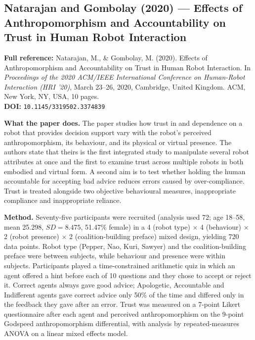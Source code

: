 \documentclass[11pt, a4paper]{article}
\begin{document}
\vspace{8pt}

\subsection{Natarajan and Gombolay (2020) --- Effects of Anthropomorphism and Accountability on Trust in Human Robot Interaction}

\begin{refbox}
\textbf{Full reference:} Natarajan, M., \& Gombolay, M. (2020). Effects of Anthropomorphism and Accountability on Trust in Human Robot Interaction. In \textit{Proceedings of the 2020 ACM/IEEE International Conference on Human-Robot Interaction (HRI '20)}, March 23--26, 2020, Cambridge, United Kingdom. ACM, New York, NY, USA, 10 pages.\\
\textbf{DOI:} \texttt{10.1145/3319502.3374839}
\end{refbox}

\textbf{What the paper does.} The paper studies how trust in and dependence on a robot that provides decision support vary with the robot's perceived anthropomorphism, its behaviour, and its physical or virtual presence. The authors state that theirs is the first integrated study to manipulate several robot attributes at once and the first to examine trust across multiple robots in both embodied and virtual form. A second aim is to test whether holding the human accountable for accepting bad advice reduces errors caused by over-compliance. Trust is treated alongside two objective behavioural measures, inappropriate compliance and inappropriate reliance.

\textbf{Method.} Seventy-five participants were recruited (analysis used 72; age 18--58, mean 25.298, $SD = 8.475$, 51.47\% female) in a 4 (robot type) $\times$ 4 (behaviour) $\times$ 2 (robot presence) $\times$ 2 (coalition-building preface) mixed design, yielding 720 data points. Robot type (Pepper, Nao, Kuri, Sawyer) and the coalition-building preface were between subjects, while behaviour and presence were within subjects. Participants played a time-constrained arithmetic quiz in which an agent offered a hint before each of 10 questions and they chose to accept or reject it. Correct agents always gave good advice; Apologetic, Accountable and Indifferent agents gave correct advice only 50\% of the time and differed only in the feedback they gave after an error. Trust was measured on a 7-point Likert questionnaire after each agent and perceived anthropomorphism on the 9-point Godspeed anthropomorphism differential, with analysis by repeated-measures ANOVA on a linear mixed effects model.
\end{document}
